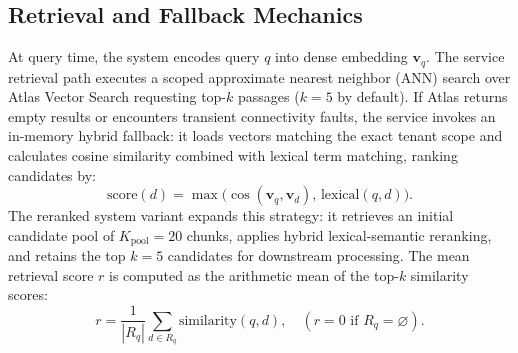 \documentclass[conference]{IEEEtran}
\begin{document}
\subsection{Retrieval and Fallback Mechanics}
At query time, the system encodes query $q$ into dense embedding $\mathbf{v}_q$.
The service retrieval path executes a scoped approximate nearest neighbor (ANN) search
over Atlas Vector Search requesting top-$k$ passages ($k = 5$ by default).
If Atlas returns empty results or encounters transient connectivity faults,
the service invokes an in-memory hybrid fallback: it loads vectors matching the
exact tenant scope and calculates cosine similarity combined with lexical term
matching, ranking candidates by:
\begin{equation}
  \text{score}(d) = \max\bigl(\cos(\mathbf{v}_q, \mathbf{v}_d),\, \text{lexical}(q, d)\bigr).
\end{equation}
The reranked system variant expands this strategy: it retrieves an initial candidate
pool of $K_{\text{pool}} = 20$ chunks, applies hybrid lexical-semantic reranking,
and retains the top $k = 5$ candidates for downstream processing.
The mean retrieval score $r$ is computed as the arithmetic mean of the top-$k$
similarity scores:
\begin{equation}
  r = \frac{1}{|R_q|}\sum_{d \in R_q} \text{similarity}(q, d), \quad (r = 0 \text{ if } R_q = \varnothing).
\end{equation}
\end{document}
